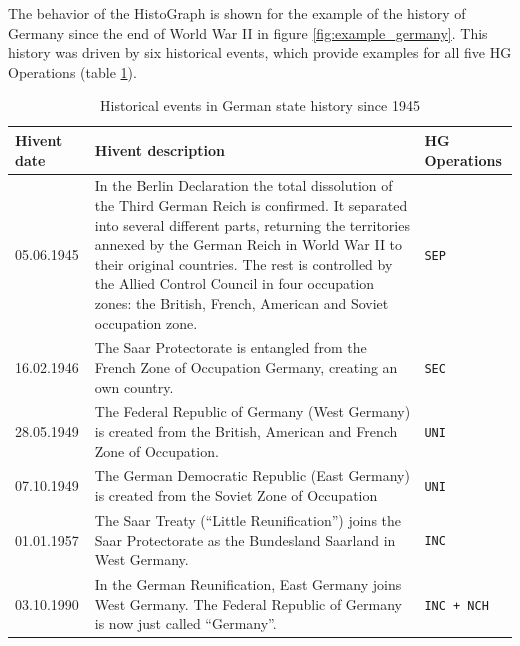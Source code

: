 The behavior of the HistoGraph is shown for the example of the history of Germany since the end of World War II in figure \ref{fig:example_germany}. This history was driven by six historical events, which provide examples for all five HG Operations (table \ref{tab:german_history_since_1945}).

\begin{table}[H]
\begin{center}
\begin{tabular}{l p{8.5cm} l}
  \toprule
  Hivent date & Hivent description & HG Operations \\
  \midrule

    05.06.1945
  & \footnotesize{In the Berlin Declaration the total dissolution of the Third German Reich is confirmed. It separated into several different parts, returning the territories annexed by the German Reich in World War II to their original countries. The rest is controlled by the Allied Control Council in four occupation zones: the British, French, American and Soviet occupation zone.}
  & \texttt{SEP} \\

    16.02.1946
  & \footnotesize{The Saar Protectorate is entangled from the French Zone of Occupation Germany, creating an own country.}
  & \texttt{SEC} \\

    28.05.1949
  & \footnotesize{The Federal Republic of Germany (West Germany) is created from the British, American and French Zone of Occupation.}
  & \texttt{UNI} \\

    07.10.1949
  & \footnotesize{The German Democratic Republic (East Germany) is created from the Soviet Zone of Occupation}
  & \texttt{UNI} \\

    01.01.1957
  & \footnotesize{The Saar Treaty (``Little Reunification'') joins the Saar Protectorate as the Bundesland Saarland in West Germany.}
  & \texttt{INC} \\

    03.10.1990
  & \footnotesize{In the German Reunification, East Germany joins West Germany. The Federal Republic of Germany is now just called ``Germany''.}
  & \texttt{INC + NCH} \\

  \bottomrule
\end{tabular}
\caption{Historical events in German state history since 1945}
\label{tab:german_history_since_1945}
\end{center}
\end{table}

